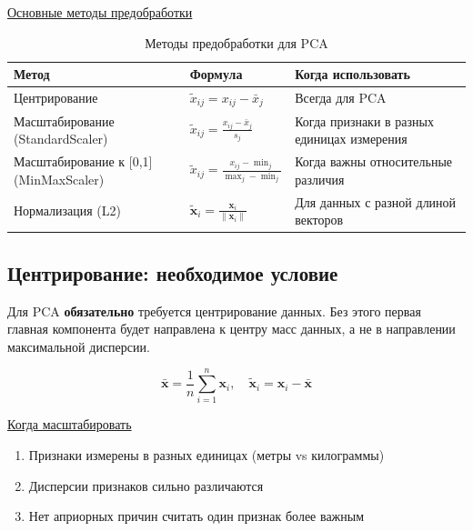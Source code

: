 \underline{Основные методы предобработки}

\begin{table}[h]
    \centering
    \begin{tabular}{|p{}|p{}|p{}|}
        \hline
        \textbf{Метод}                         & \textbf{Формула}                                           & \textbf{Когда использовать}                \\ \hline
        Центрирование                          & $\tilde{x}_{ij} = x_{ij} - \bar{x}_j$                      & Всегда для PCA                             \\\hline
        Масштабирование (StandardScaler)       & $\tilde{x}_{ij} = \frac{x_{ij} - \bar{x}_j}{s_j}$ & Когда признаки в разных единицах измерения \\\hline
        Масштабирование к [0,1] (MinMaxScaler) & $\tilde{x}_{ij} = \frac{x_{ij} - \min_j}{\max_j - \min_j}$ & Когда важны относительные различия \\\hline
        Нормализация (L2)                      & $\tilde{\bm{x}}_i = \frac{\bm{x}_i}{\|\bm{x}_i\|}$         & Для данных с разной длиной векторов        \\\hline
    \end{tabular}
    \caption{Методы предобработки для PCA}
    \label{tab:methods}
\end{table}

\subsection*{Центрирование: необходимое условие}

Для PCA \textbf{обязательно} требуется центрирование данных.
Без этого первая главная компонента будет направлена к центру масс данных, а не в направлении максимальной дисперсии.

\[ \bar{\bm{x}} = \frac{1}{n} \sum_{i=1}^n \bm{x}_i, \quad \tilde{\bm{x}}_i = \bm{x}_i - \bar{\bm{x}} \]

\underline{Когда масштабировать}

\begin{enumerate}
    \item Признаки измерены в разных единицах (метры vs килограммы)
    \item Дисперсии признаков сильно различаются
    \item Нет априорных причин считать один признак более важным
\end{enumerate}


